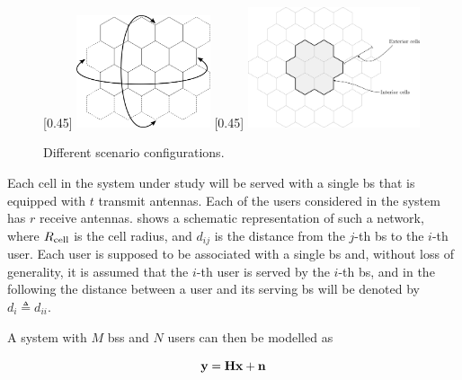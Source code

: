 \begin{figure}[t]
    [0.45\textwidth]
    {
     \includegraphics[width=0.35\textwidth]{./03.system_model/img/torus_scenario}
    }
    \hfill
    [0.45\textwidth]
    {
    \includegraphics[width=0.45\textwidth]{./03.system_model/img/interfering_scenario}
    }
    \caption{Different scenario configurations.}\label{fig:scenario_types}
\end{figure}

Each cell in the system under study will be served with a single \gls{bs} that
is equipped with $t$ transmit antennas. Each of the users considered in the
system has $r$ receive antennas.  shows a
schematic representation of such a network, where $R_{\text{cell}}$ is the cell
radius, and $d_{ij}$ is the distance from the $j$-th \gls{bs} to the $i$-th
user. Each user is supposed to be associated with a single \gls{bs} and, without
loss of generality, it is assumed that the $i$-th user is served by the $i$-th
\gls{bs}, and in the following the distance between a user and its serving
\gls{bs} will be denoted by $d_i \triangleq d_{ii}$.

A system with $M$ \glspl{bs} and $N$ users can then be modelled as

\begin{equation} \label{eq:generic_system_model}
    \mathbf{y} = \mathbf{H} \mathbf{x} + \mathbf{n}
\end{equation}


